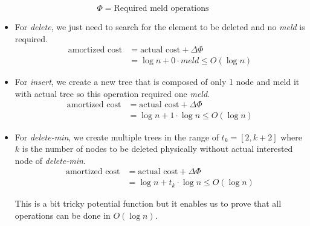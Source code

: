 \begin{enumerate}
 $$
  \Phi = \text{Required meld operations}
 $$
 
 \begin{itemize}
   \item For \textit{delete}, we just need to search for the element to be deleted and no \textit{meld} is required.
   \begin{align*}
    \text{amortized cost} &= \text{actual cost} + \Delta\Phi \\                          
                          &= \log n + 0 \cdot meld \leq O(\log n)   
   \end{align*}
   
   \item For \textit{insert}, we create a new tree that is composed of only 1 node and meld it with actual tree so this operation required one \textit{meld}. 
   \begin{align*}
    \text{amortized cost} &= \text{actual cost} + \Delta\Phi \\                          
                          &= \log n + 1 \cdot \log n \leq O(\log n)   
   \end{align*}
   
   \item For \textit{delete-min}, we create multiple trees in the range of $t_k = [2, k+2]$ where $k$ is the number of nodes to be deleted physically without actual interested node of \textit{delete-min}.
   \begin{align*}
    \text{amortized cost} &= \text{actual cost} + \Delta\Phi \\                          
                          &= \log n + t_k \cdot \log n \leq O(\log n)   
   \end{align*}
   
   This is a bit tricky potential function but it enables us to prove that all operations can be done in $O(\log n)$.
   
 \end{itemize}

\end{enumerate}